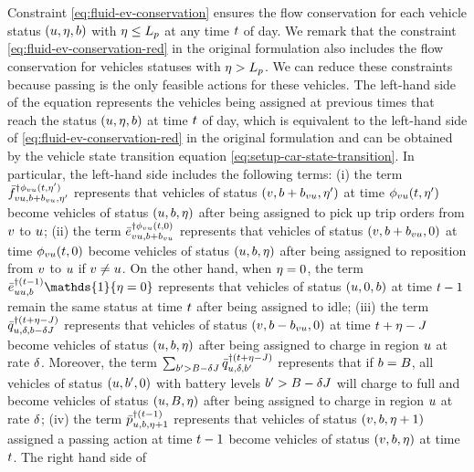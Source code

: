 Constraint \eqref{eq:fluid-ev-conservation} ensures the flow conservation for each vehicle status $(\origin, \timetoarrival, \battery)$ with $\timetoarrival \leq \Lp$ at any time $\time$ of day. We remark that the constraint \eqref{eq:fluid-ev-conservation-red} in the original formulation also includes the flow conservation for vehicles statuses with $\timetoarrival > \Lp$. We can reduce these constraints because passing is the only feasible actions for these vehicles. 
The left-hand side of the equation represents the vehicles being assigned at previous times that reach the status $(\origin, \timetoarrival, \battery)$ at time $\time$ of day, which is equivalent to the left-hand side of \eqref{eq:fluid-ev-conservation-red} in the original formulation and can be obtained by the vehicle state transition equation \eqref{eq:setup-car-state-transition}. In particular, the left-hand side includes the following terms: (i) the term $\lpredtripfulfill{\destination \origin, \battery + \batterycost{\destination \origin}, \timetoarrival'}{\phi_{\destination \origin}(t, \timetoarrival')}$ represents that vehicles of status $(\destination, \battery + \batterycost{\destination \origin}, \timetoarrival')$ at time $\phi_{\destination \origin}(\time, \timetoarrival')$ become vehicles of status $(\origin, \battery, \timetoarrival)$ after being assigned to pick up trip orders from $\destination$ to $\origin$; (ii) the term $\lpredreroute{\destination \origin, \battery + \batterycost{\destination \origin}}{\phi_{\destination \origin}(t, 0)}$ represents that vehicles of status $(\destination, \battery + \batterycost{\destination \origin}, 0)$ at time $\phi_{\destination \origin}(\time, 0)$ become vehicles of status $(\origin, \battery, \timetoarrival)$ after being assigned to reposition from $\destination$ to $\origin$ if $\destination \neq \origin$. On the other hand, when $\timetoarrival = 0$, the term $\lpredreroute{\origin \origin, \battery}{(\time - 1)} \mathds{1}\{\timetoarrival = 0\}$ represents that vehicles of status $(\origin, 0, \battery)$ at time $\time - 1$ remain the same status at time $\time$ after being assigned to idle; (iii) the term $\lpredcharge{\origin, \type, \battery - \type \chargetime}{(\time + \timetoarrival - \chargetime)}$ represents that vehicles of status $(\destination, \battery - \batterycost{\destination \origin}, 0)$ at time $\time + \timetoarrival - \chargetime$ become vehicles of status $(\origin, \battery, \timetoarrival)$ after being assigned to charge in region $\origin$ at rate $\type$. Moreover, the term $\sum_{\battery' > \range - \type \chargetime} \lpredcharge{\origin, \type, \battery'}{(\time + \timetoarrival - \chargetime)}$ represents that if $\battery = \range$, all vehicles of status $(\origin, \battery', 0)$ with battery levels $\battery' > \range - \type \chargetime$ will charge to full and become vehicles of status $(\origin, \range, \timetoarrival)$ after being assigned to charge in region $\origin$ at rate $\type$; (iv) the term $\lpredpass{\origin, \battery, \timetoarrival + 1}{(\time - 1)}$ represents that vehicles of status $(\region, \battery, \timetoarrival + 1)$ assigned a passing action at time $\time - 1$ become vehicles of status $(\region, \battery, \timetoarrival)$ at time $\time$. The right hand side of 